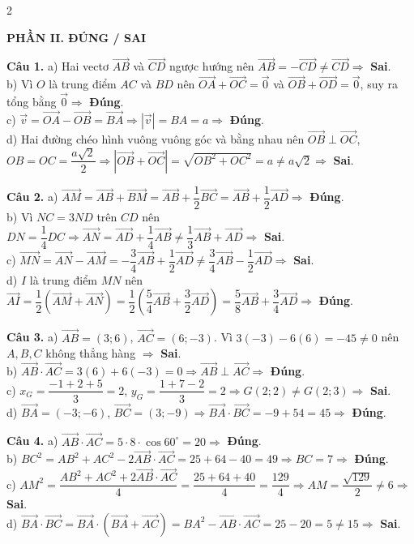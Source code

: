 \documentclass[10pt,a4paper]{article}
\begin{document}
\begin{multicols}{2}
\raggedcolumns
\small

\textbf{\color{accent}PHẦN II. ĐÚNG / SAI}

\textbf{Câu 1.}
a) Hai vectơ $\vec{AB}$ và $\vec{CD}$ ngược hướng nên $\vec{AB} = -\vec{CD} \ne \vec{CD} \Rightarrow$ \textbf{Sai}.\\
b) Vì $O$ là trung điểm $AC$ và $BD$ nên $\vec{OA} + \vec{OC} = \vec{0}$ và $\vec{OB} + \vec{OD} = \vec{0}$, suy ra tổng bằng $\vec{0} \Rightarrow$ \textbf{Đúng}.\\
c) $\vec{v} = \vec{OA} - \vec{OB} = \vec{BA} \Rightarrow |\vec{v}| = BA = a \Rightarrow$ \textbf{Đúng}.\\
d) Hai đường chéo hình vuông vuông góc và bằng nhau nên $\vec{OB} \perp \vec{OC}$, $OB = OC = \dfrac{a\sqrt{2}}{2} \Rightarrow |\vec{OB} + \vec{OC}| = \sqrt{OB^2 + OC^2} = a \ne a\sqrt{2} \Rightarrow$ \textbf{Sai}.

\textbf{Câu 2.}
a) $\vec{AM} = \vec{AB} + \vec{BM} = \vec{AB} + \dfrac{1}{2}\vec{BC} = \vec{AB} + \dfrac{1}{2}\vec{AD} \Rightarrow$ \textbf{Đúng}.\\
b) Vì $NC = 3ND$ trên $CD$ nên $DN = \dfrac{1}{4}DC \Rightarrow \vec{AN} = \vec{AD} + \dfrac{1}{4}\vec{AB} \ne \dfrac{1}{3}\vec{AB} + \vec{AD} \Rightarrow$ \textbf{Sai}.\\
c) $\vec{MN} = \vec{AN} - \vec{AM} = -\dfrac{3}{4}\vec{AB} + \dfrac{1}{2}\vec{AD} \ne \dfrac{3}{4}\vec{AB} - \dfrac{1}{2}\vec{AD} \Rightarrow$ \textbf{Sai}.\\
d) $I$ là trung điểm $MN$ nên $\vec{AI} = \dfrac{1}{2}(\vec{AM} + \vec{AN}) = \dfrac{1}{2}\left(\dfrac{5}{4}\vec{AB} + \dfrac{3}{2}\vec{AD}\right) = \dfrac{5}{8}\vec{AB} + \dfrac{3}{4}\vec{AD} \Rightarrow$ \textbf{Đúng}.

\textbf{Câu 3.}
a) $\vec{AB} = (3; 6)$, $\vec{AC} = (6; -3)$. Vì $3(-3) - 6(6) = -45 \ne 0$ nên $A, B, C$ không thẳng hàng $\Rightarrow$ \textbf{Sai}.\\
b) $\vec{AB} \cdot \vec{AC} = 3(6) + 6(-3) = 0 \Rightarrow \vec{AB} \perp \vec{AC} \Rightarrow$ \textbf{Đúng}.\\
c) $x_G = \dfrac{-1+2+5}{3} = 2$, $y_G = \dfrac{1+7-2}{3} = 2 \Rightarrow G(2; 2) \ne G(2; 3) \Rightarrow$ \textbf{Sai}.\\
d) $\vec{BA} = (-3; -6)$, $\vec{BC} = (3; -9) \Rightarrow \vec{BA} \cdot \vec{BC} = -9 + 54 = 45 \Rightarrow$ \textbf{Đúng}.

\textbf{Câu 4.}
a) $\vec{AB} \cdot \vec{AC} = 5 \cdot 8 \cdot \cos 60^\circ = 20 \Rightarrow$ \textbf{Đúng}.\\
b) $BC^2 = AB^2 + AC^2 - 2\vec{AB}\cdot\vec{AC} = 25 + 64 - 40 = 49 \Rightarrow BC = 7 \Rightarrow$ \textbf{Đúng}.\\
c) $AM^2 = \dfrac{AB^2 + AC^2 + 2\vec{AB}\cdot\vec{AC}}{4} = \dfrac{25 + 64 + 40}{4} = \dfrac{129}{4} \Rightarrow AM = \dfrac{\sqrt{129}}{2} \ne 6 \Rightarrow$ \textbf{Sai}.\\
d) $\vec{BA} \cdot \vec{BC} = \vec{BA} \cdot (\vec{BA} + \vec{AC}) = BA^2 - \vec{AB}\cdot\vec{AC} = 25 - 20 = 5 \ne 15 \Rightarrow$ \textbf{Sai}.


\end{multicols}
\end{document}
